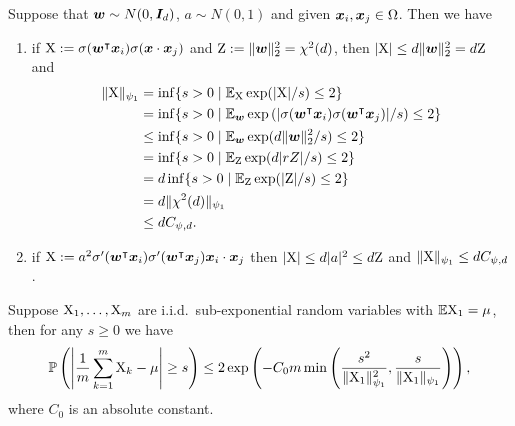\documentclass{article}
\begin{document}
\begin{rmk}
    Suppose that $\bm{w}\sim N(0,\bm{I}_d)$, $a\sim N(0,1)$ and given $\bm{x}_i,\bm{x}_j \in\Omega$. Then we have
    \begin{enumerate}
        \item if $\textnormal{X}:=\sigma(\bm{w}^\intercal\bm{x}_i)\sigma(\bm{x}\cdot\bm{x}_j)$ and $\textnormal{Z}:=\lVert\bm{w}\rVert^2_2=\chi^2(d)$, then $\lvert\textnormal{X}\rvert\leq d\lVert\bm{w}\rVert^2_2=d\textnormal{Z}$ and
              \begin{equation}
                  \begin{aligned}
                      \lVert\textnormal{X}\rVert_{\psi_1}
                       & =\inf\{s>0\mid\mathbb{E}_{\textnormal{X}}\exp(\lvert\textnormal{X}\rvert/s)\leq 2\}                                                   \\
                       & =\inf\{s>0\mid\mathbb{E}_{\bm{w}}\exp\left(\lvert\sigma(\bm{w}^\intercal\bm{x}_i)\sigma(\bm{w}^\intercal\bm{x}_j)\rvert/s\right)\leq 2\} \\
                       & \leq\inf\{s>0\mid\mathbb{E}_{\bm{w}}\exp(d\lVert\bm{w}\rVert^2_2/s)\leq 2\}                                          \\
                       & =\inf\{s>0\mid\mathbb{E}_{\textnormal{Z}}\exp(d\lvert rZ\rvert/s)\leq 2\}                                                   \\
                       & =d\inf\{s>0\mid\mathbb{E}_{\textnormal{Z}}\exp(\lvert\textnormal{Z}\rvert/s)\leq 2\}                                                  \\
                       & =d\lVert\chi^2(d)\rVert_{\psi_1}                                                                         \\
                       & \leq dC_{\psi,d}.
                  \end{aligned}
              \end{equation}
        \item if $\textnormal{X}:=a^2\sigma'(\bm{w}^\intercal\bm{x}_i)\sigma'(\bm{w}^\intercal\bm{x}_j)\bm{x}_i\cdot\bm{x}_j$ then $\lvert\textnormal{X}\rvert\leq d\lvert a\rvert^2\leq d\textnormal{Z}$ and $\lVert\textnormal{X}\rVert_{\psi_1}\leq dC_{\psi,d}$.
    \end{enumerate}
\end{rmk}
\begin{thm}\label{thm:sub_exp}
    Suppose $\textnormal{X}_1,\ldots,\textnormal{X}_m$ are i.i.d.\ sub-exponential random variables with $\mathbb{E}\textnormal{X}_1=\mu$, then for any $s\geq 0$ we have
    \begin{equation}
        \mathbb{P}\left(\left\lvert\frac{1}{m}\sum_{k=1}^m\textnormal{X}_k-\mu\right\rvert\geq s\right)\leq 2\exp\left(-C_0 m \min\left(\frac{s^2}{\lVert\textnormal{X}_1\rVert^2_{\psi_1}},\frac{s}{\lVert\textnormal{X}_1\rVert_{\psi_1}}\right)\right),
    \end{equation}
    where $C_0$ is an absolute constant.
\end{thm}
\end{document}
